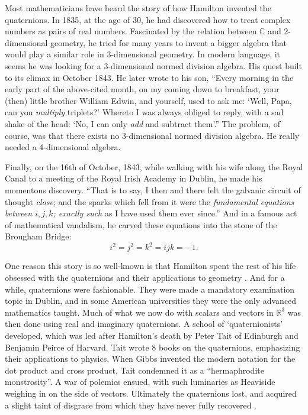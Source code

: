 \documentclass[12pt]{article}
\newcommand\R{{\mathbb R}}
\newcommand\C{{\mathbb C}}
\begin{document}
Most mathematicians have heard the story of how Hamilton invented the   
quaternions.  In 1835, at the age of 30, he had discovered how to treat   
complex numbers as pairs of real numbers.   Fascinated by the relation   
between $\C$ and 2-dimensional geometry, he tried for many years to   
invent a bigger algebra that would play a similar role in 3-dimensional   
geometry.  In modern language, it seems he was looking for a 3-dimensional   
normed division algebra.  His quest built to its climax in October 1843.   
He later wrote to his son, ``Every morning in the early part of the   
above-cited month, on my coming down to breakfast, your (then) little   
brother William Edwin, and yourself, used to ask me: `Well, Papa, can you   
{\it multiply} triplets?'  Whereto I was always obliged to reply, with a sad   
shake of the head: `No, I can only {\it add} and subtract them'.''     
The problem, of course, was that there exists no 3-dimensional normed    
division algebra.  He really needed a 4-dimensional algebra.   
   
Finally, on the 16th of October, 1843, while walking with his wife along   
the Royal Canal to a meeting of the Royal Irish Academy in Dublin, he made    
his momentous discovery.  ``That is to say, I then and there felt the    
galvanic circuit of thought {\it close}; and the sparks which fell from it    
were the {\it fundamental equations between $i,j,k$; exactly such} as I have    
used them ever since.''  And in a famous act of mathematical vandalism, he   
carved these equations into the stone of the Brougham Bridge:    
\[    i^2 = j^2 = k^2 = ijk = -1 .\]    
   
One reason this story is so well-known is that Hamilton spent the rest   
of his life obsessed with the quaternions and their applications to   
geometry \cite{Graves,Hankins}.  And for a while, quaternions  were   
fashionable.  They were made a mandatory examination topic in Dublin,   
and in some American universities they were the only advanced   
mathematics taught.  Much of what we now do with scalars and vectors in   
$\R^3$ was  then done using real and imaginary quaternions.   A school   
of `quaternionists' developed, which was led after Hamilton's death by   
Peter Tait of Edinburgh and Benjamin Peirce of Harvard.  Tait wrote 8   
books on the quaternions, emphasizing their applications to physics.    
When Gibbs invented the modern notation for the dot product and cross   
product, Tait condemned it as a ``hermaphrodite monstrosity''.  A war of   
polemics ensued, with such luminaries as Heaviside weighing   
in on the side of vectors.  Ultimately the quaternions lost, and   
acquired a slight taint of disgrace from which they have never fully   
recovered \cite{Crowe}.    
   
\end{document}
